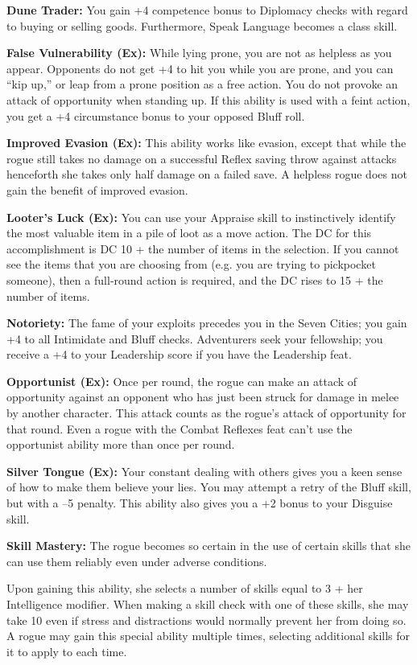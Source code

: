 \textbf{Dune Trader:} You gain +4 competence bonus to Diplomacy checks with regard to buying or selling goods. Furthermore, Speak Language becomes a class skill.

\textbf{False Vulnerability (Ex):} While lying prone, you are not as helpless as you appear. Opponents do not get +4 to hit you while you are prone, and you can “kip up,” or leap from a prone position as a free action. You do not provoke an attack of opportunity when standing up. If this ability is used with a feint action, you get a +4 circumstance bonus to your opposed Bluff roll.

\textbf{Improved Evasion (Ex):} This ability works like evasion, except that while the rogue still takes no damage on a successful Reflex saving throw against attacks henceforth she takes only half damage on a failed save. A helpless rogue does not gain the benefit of improved evasion.

\textbf{Looter’s Luck (Ex):} You can use your Appraise skill to instinctively identify the most valuable item in a pile of loot as a move action. The DC for this accomplishment is DC 10 + the number of items in the selection. If you cannot see the items that you are choosing from (e.g. you are trying to pickpocket someone), then a full‐round action is required, and the DC rises to 15 + the number of items.

\textbf{Notoriety:} The fame of your exploits precedes you in the Seven Cities; you gain +4 to all Intimidate and Bluff checks. Adventurers seek your fellowship; you receive a +4 to your Leadership score if you have the Leadership feat.

\textbf{Opportunist (Ex):} Once per round, the rogue can make an attack of opportunity against an opponent who has just been struck for damage in melee by another character. This attack counts as the rogue’s attack of opportunity for that round. Even a rogue with the Combat Reflexes feat can’t use the opportunist ability more than once per round.

\textbf{Silver Tongue (Ex):} Your constant dealing with others gives you a keen sense of how to make them believe your lies. You may attempt a retry of the Bluff skill, but with a –5 penalty. This ability also gives you a +2 bonus to your Disguise skill.

\textbf{Skill Mastery:} The rogue becomes so certain in the use of certain skills that she can use them reliably even under adverse conditions.

Upon gaining this ability, she selects a number of skills equal to 3 + her Intelligence modifier. When making a skill check with one of these skills, she may take 10 even if stress and distractions would normally prevent her from doing so. A rogue may gain this special ability multiple times, selecting additional skills for it to apply to each time.


